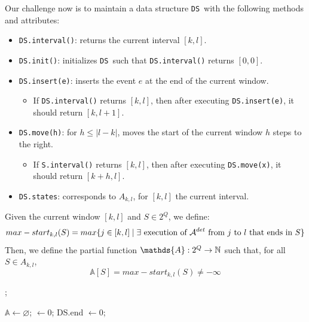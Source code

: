 \newcommand{\DS}{\texttt{DS}}
\newcommand{\dsA}{\mathds{A}}

Our challenge now is to maintain a data structure \DS\ with the following methods and attributes:
\begin{itemize}
	\item \texttt{DS.interval()}: returns the current interval $[k,l]$.
	\item \texttt{DS.init()}: initializes \DS\ such that \texttt{DS.interval()} returns $[0,0]$.
	\item \texttt{DS.insert(e)}: inserts the event $e$ at the end of the current window.
	\begin{itemize}
		\item If \texttt{DS.interval()} returns $[k,l]$, then after executing \texttt{DS.insert(e)}, it should return $[k,l+1]$.
	\end{itemize}
	\item \texttt{DS.move(h)}: for $h\leq|l-k|$, moves the start of the current window $h$ steps to the right.
	\begin{itemize}
		\item If \texttt{S.interval()} returns $[k,l]$, then after executing \texttt{DS.move(x)}, it should return $[k+h,l]$.
	\end{itemize}
	\item \texttt{DS.states}: corresponds to $A_{k,l}$, for $[k,l]$ the current interval.    
\end{itemize}

Given the current window $[k,l]$ and $S\in 2^Q$, we define:
$$max-start_{k,l}(S) = max\{j \in [k,l] \mid \exists \text{ execution of }\mathcal{A}^{det} \text{ from }j\text{ to }l \text{ that ends in }S \}$$
Then, we define the partial function $\dsA: 2^Q \rightarrow \bbN$ such that, for all $S\in A_{k,l}$,
$$ \dsA[S] = max-start_{k,l}(S) \neq -\infty $$

\begin{algorithm}[H]
\caption{{DS.interval()}}
\begin{algorithmic}[1]
\State  {};	
\end{algorithmic}
\end{algorithm}

\begin{algorithm}[H]
\caption{DS.init()}
\begin{algorithmic}[1]
\State $\dsA \gets \varnothing$;
 $\gets 0$; {DS.end} $\gets 0$;
\end{algorithmic}
\end{algorithm}

